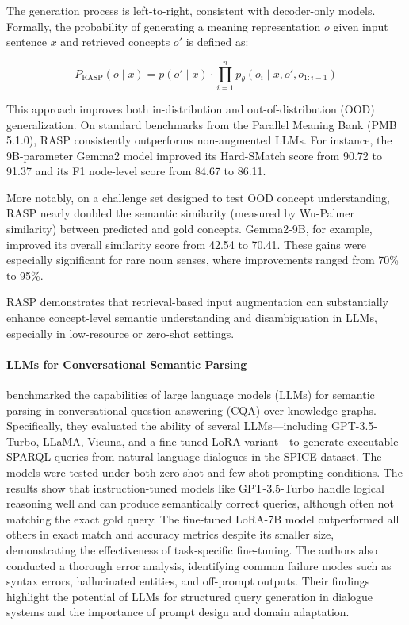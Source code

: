 The generation process is left-to-right, consistent with decoder-only models. Formally, the probability of generating a meaning representation \( o \) given input sentence \( x \) and retrieved concepts \( o' \) is defined as:

\[
P_{\text{RASP}}(o \mid x) = p(o' \mid x) \cdot \prod_{i=1}^{n} p_\theta(o_i \mid x, o', o_{1:i-1})
\]

This approach improves both in-distribution and out-of-distribution (OOD) generalization. On standard benchmarks from the Parallel Meaning Bank (PMB 5.1.0), RASP consistently outperforms non-augmented LLMs. For instance, the 9B-parameter Gemma2 model improved its Hard-SMatch score from 90.72 to 91.37 and its F1 node-level score from 84.67 to 86.11. 

More notably, on a challenge set designed to test OOD concept understanding, RASP nearly doubled the semantic similarity (measured by Wu-Palmer similarity) between predicted and gold concepts. Gemma2-9B, for example, improved its overall similarity score from 42.54 to 70.41. These gains were especially significant for rare noun senses, where improvements ranged from 70\% to 95\%.

RASP demonstrates that retrieval-based input augmentation can substantially enhance concept-level semantic understanding and disambiguation in LLMs, especially in low-resource or zero-shot settings.

\paragraph{LLMs for Conversational Semantic Parsing}

\cite{semler2023llmsp} benchmarked the capabilities of large language models (LLMs) for semantic parsing in conversational question answering (CQA) over knowledge graphs. Specifically, they evaluated the ability of several LLMs—including GPT-3.5-Turbo, LLaMA, Vicuna, and a fine-tuned LoRA variant—to generate executable SPARQL queries from natural language dialogues in the SPICE dataset. The models were tested under both zero-shot and few-shot prompting conditions. The results show that instruction-tuned models like GPT-3.5-Turbo handle logical reasoning well and can produce semantically correct queries, although often not matching the exact gold query. The fine-tuned LoRA-7B model outperformed all others in exact match and accuracy metrics despite its smaller size, demonstrating the effectiveness of task-specific fine-tuning. The authors also conducted a thorough error analysis, identifying common failure modes such as syntax errors, hallucinated entities, and off-prompt outputs. Their findings highlight the potential of LLMs for structured query generation in dialogue systems and the importance of prompt design and domain adaptation.

